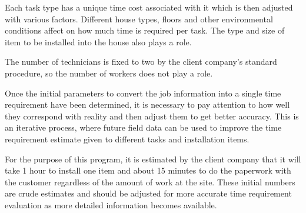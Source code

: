 Each task type has a unique time cost associated with it which is then adjusted with various factors. Different house types, floors and other environmental conditions affect on how much time is required per task. The type and size of item to be installed into the house also plays a role. 

The number of technicians is fixed to two by the client company's standard procedure, so the number of workers does not play a role.  

Once the initial parameters to convert the job information into a single time requirement have been determined, it is necessary to pay attention to how well they correspond with reality and then adjust them to get better accuracy. This is an iterative process, where future field data can be used to improve the time requirement estimate given to different tasks and installation items.

For the purpose of this program, it is estimated by the client company that it will take 1 hour to install one item and about 15 minutes to do the paperwork with the customer regardless of the amount of work at the site. These initial numbers are crude estimates and should be adjusted for more accurate time requirement evaluation as more detailed information becomes available.


